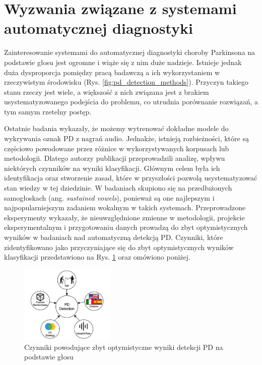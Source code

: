 
\section{Wyzwania związane z systemami automatycznej diagnostyki}\label{sec:wyzwania}

Zainteresowanie systemami do automatycznej diagnostyki choroby Parkinsona na podstawie głosu jest ogromne i wiąże się z nim duże nadzieje.
Istnieje jednak duża dysproporcja pomiędzy pracą badawczą a ich wykorzystaniem w rzeczywistym środowisku (Rys. \ref{fig:pd_detection_methods}).
Przyczyn takiego stanu rzeczy jest wiele, a większość z nich związana jest z brakiem usystematyzowanego podejścia do problemu, co utrudnia porównanie
rozwiązań, a tym samym rzetelny postęp.

Ostatnie badania wykazały, że możemy wytrenować dokładne modele do wykrywania oznak PD z nagrań audio.
Jednakże, istnieją rozbieżności, które są częściowo powodowane przez różnice w
wykorzystywanych korpusach lub metodologii.
Dlatego autorzy publikacji \cite{SustainedVowelsProblems} przeprowadzili analizę, wpływu niektórych czynników na wyniki klasyfikacji.
Głównym celem była ich identyfikacja oraz stworzenie zasad, które w przyszłości pozwolą usystematyzować stan wiedzy w tej dziedzinie.
W badaniach skupiono się na przedłużonych samogłoskach (ang. \emph{sustained vowels}), ponieważ są one najlepszym i najpopularniejszym zadaniem
wokalnym w takich systemach.
Przeprowadzone eksperymenty wykazały, że nieuwzględnione zmienne w metodologii, projekcie eksperymentalnym i
przygotowaniu danych prowadzą do zbyt optymistycznych wyników w badaniach nad automatyczną detekcją PD.
Czynniki, które zidentyfikowano jako przyczyniające się do zbyt optymistycznych wyników klasyfikacji
przedstawiono na Rys. \ref{fig:factors_PD_detection} oraz omówiono poniżej.


\begin{figure}[htbp]
	\centering
	\includegraphics[width=0.4\textwidth]{./img/influence_of_factors_on_PD_detection}
	\caption{Czynniki powodujące zbyt optymistyczne wyniki detekcji PD na podstawie głosu \cite{SustainedVowelsProblems}}
    \label{fig:factors_PD_detection}
\end{figure}


